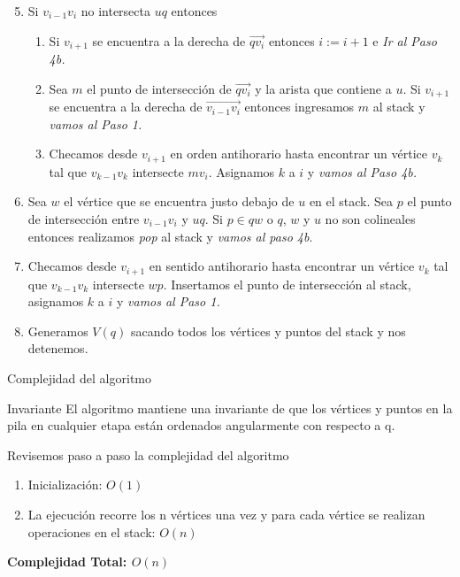 \documentclass[aspectratio=169,xcolor=dvipsnames, t]{beamer}
\begin{document}
\begin{frame}{}
  \begin{enumerate}
    \setcounter{enumi}{4} 
  \item Si $v_{i-1}v_{i}$ no intersecta $uq$ entonces
    \begin{enumerate}
    \item Si $v_{i+1}$ se encuentra a la derecha de $\overrightarrow{qv_{i}}$ entonces $i := i + 1$ e \textit{Ir al Paso 4b.}
    \item Sea $m$ el punto de intersección de $\overrightarrow{qv_{i}}$ y la arista que contiene a $u$. Si $v_{i+1}$ se encuentra a la derecha de $\overrightarrow{v_{i-1}v_{i}}$ entonces ingresamos $m$ al stack y \textit{vamos al Paso 1.}
    \item Checamos desde $v_{i+1}$ en orden antihorario hasta encontrar un vértice $v_{k}$ tal que $v_{k-1}v_{k}$ intersecte $mv_{i}$. Asignamos $k$ a $i$ y \textit{vamos al Paso 4b.}
    \end{enumerate}
  \item Sea $w$ el vértice que se encuentra justo debajo de $u$ en el stack. Sea $p$ el punto de intersección entre $v_{i-1}v_{i}$ y $uq$. Si $p \in qw$ o $q$, $w$ y $u$ no son colineales entonces realizamos \textit{pop} al stack y \textit{vamos al paso 4b}.
  \item Checamos desde $v_{i+1}$ en sentido antihorario hasta encontrar un vértice $v_{k}$ tal que $v_{k-1}v_{k}$ intersecte $wp$. Insertamos el punto de intersección al stack, asignamos $k$ a $i$ y \textit{vamos al Paso 1.}
  \item Generamos $V(q)$ sacando todos los vértices y puntos del stack y nos detenemos.
  \end{enumerate}
\end{frame}




\begin{frame}{Complejidad del algoritmo}
  \begin{block}{Invariante}
    El algoritmo mantiene una invariante de que los vértices y puntos en la pila en cualquier etapa están ordenados angularmente con respecto a q.
  \end{block}    
  \vspace{0.5cm}
  Revisemos paso a paso la complejidad del algoritmo
  \begin{enumerate}
  \item Inicialización: $O(1)$
  \item La ejecución recorre los n vértices una vez y para cada vértice se realizan operaciones en el stack: $O(n)$
  \end{enumerate}
  \begin{center}
    \textbf{Complejidad Total: $O(n)$}
  \end{center}
\end{frame}
\end{document}
